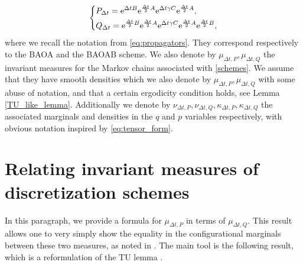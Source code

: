 \begin{equation}
  \label{schemes}
  \left\{\begin{aligned}
    &P_{\Delta t}=\mathrm{e}^{\Delta t B}\mathrm{e}^{\frac{\Delta t}2A}\mathrm{e}^{\Delta t \gamma C}\mathrm{e}^{\frac{\Delta t}2A},\\
    &Q_{\Delta t}=\mathrm{e}^{\frac{\Delta t}2B}\mathrm{e}^{\frac{\Delta t}2A}\mathrm{e}^{\Delta t \gamma C}\mathrm{e}^{\frac{\Delta t}2A}\mathrm{e}^{\frac{\Delta t}2B},\\
\end{aligned}\right.
\end{equation}
where we recall the notation from \eqref{eq:propagators}.
They correspond respectively to the BAOA and the BAOAB scheme.
We also denote by $\mu_{\Delta t,P}, \mu_{\Delta t, Q}$ the invariant measures for the Markov chains associated with \eqref{schemes}. We assume that they have smooth densities which we also denote by $\mu_{\Delta t,P}, \mu_{\Delta t,Q}$ with some abuse of notation, and that a certain ergodicity condition holds, see Lemma \ref{TU_like_lemma}.
Additionally we denote by $\nu_{\Delta t,P},\nu_{\Delta t,Q},\kappa_{\Delta t,P},\kappa_{\Delta t,Q}$ the associated marginals and densities in the $q$ and $p$ variables respectively, with obvious notation inspired by \eqref{eq:tensor_form}.

\section{Relating invariant measures of discretization schemes}\label{relating invariant measures}
In this paragraph, we provide a formula for $\mu_{\Delta t,P}$ in terms of $\mu_{\Delta t,Q}$. This result allows one to very simply show the equality in the configurational marginals between these two measures, as noted in \cite{KK22}.
The main tool is the following result, which is a reformulation of the TU lemma \cite[Lemma 2.12]{LMS13}.

